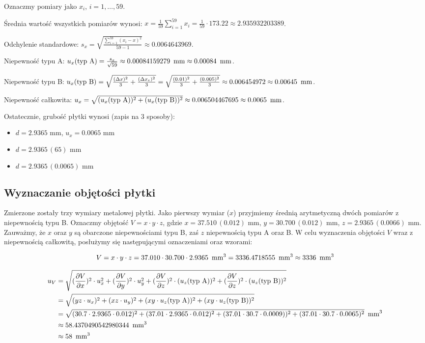 \documentclass[a4paper]{article}
\begin{document}
Oznaczmy pomiary jako $x_i$, $i = 1, \dots, 59$.

Średnia wartość wszystkich pomiarów wynosi: $x = \frac{1}{59} \sum_{i = 1}^{59} x_i = \frac{1}{59} \cdot 173.22 \approx 2.935932203389$.

Odchylenie standardowe: $s_x = \sqrt{\frac{\sum_{i=1}^{59} (x_i - x)^2}{59 - 1}} \approx 0.0064643969$.

Niepewność typu A: $u_x (\text{typ A}) = \frac{s_x}{\sqrt{59}} \approx 0.00084159279 \enskip \text{mm} \approx 0.00084 \enskip \text{mm}$.

Niepewność typu B: $u_x (\text{typ B}) = \sqrt{\frac{(\Delta x)^2}{3} + \frac{(\Delta x_e)^2}{3}} = \sqrt{\frac{(0.01)^2}{3} + \frac{(0.005)^2}{3}} \approx 0.006454972 \approx 0.00645 \enskip \text{mm}$.

Niepewność całkowita: $u_x = \sqrt{(u_x (\text{typ A}))^2 + (u_x (\text{typ B}))^2} \approx 0.006504467695 \approx 0.0065 \enskip \text{mm}$.

Ostatecznie, grubość płytki wynosi (zapis na 3 sposoby):
\begin{itemize}
\item $d = 2.9365$ mm, $u_x = 0.0065$ mm
\item $d = 2.9365 \, (65)$ mm
\item $d = 2.9365 \, (0.0065)$ mm
\end{itemize}

\subsection{Wyznaczanie objętości płytki}

Zmierzone zostały trzy wymiary metalowej płytki.
Jako pierwszy wymiar ($x$) przyjmiemy średnią arytmetyczną dwóch pomiarów z niepewnością typu B.
Oznaczmy objętość $V = x \cdot y \cdot z$, gdzie $x = 37.510 \, (0.012)$ mm, $y = 30.700 \, (0.012)$ mm, $z = 2.9365 \, (0.0066)$ mm.
Zauważmy, że $x$ oraz $y$ są obarczone niepewnościami typu B, zaś $z$ niepewnością typu A oraz B.
W celu wyznaczenia objętości $V$ wraz z niepewnością całkowitą, posłużymy się następującymi oznaczeniami oraz wzorami:

$$V = x \cdot y \cdot z = 37.010 \cdot 30.700 \cdot 2.9365 \enskip \text{mm}^3 = 3336.4718555 \enskip \text{mm}^3 \approx 3336 \enskip \text{mm}^3$$

\begin{align*}
u_V &= \sqrt{(\frac{\partial V}{\partial x})^2 \cdot u_x^2 + (\frac{\partial V}{\partial y})^2 \cdot u_y^2 + (\frac{\partial V}{\partial z})^2 \cdot (u_z \text{(typ A)})^2 + (\frac{\partial V}{\partial z})^2 \cdot (u_z \text{(typ B)})^2} \\
	&= \sqrt{(yz \cdot u_x)^2 + (xz \cdot u_y)^2 + (xy \cdot u_z \text{(typ A)})^2 + (xy \cdot u_z \text{(typ B)})^2} \\
	&= \sqrt{(30.7 \cdot 2.9365 \cdot 0.012)^2 + (37.01 \cdot 2.9365 \cdot 0.012)^2 + (37.01 \cdot 30.7 \cdot 0.0009))^2 + (37.01 \cdot 30.7 \cdot 0.0065)^2} \enskip \text{mm}^3\\
	&\approx 58.4370490542980344 \enskip \text{mm}^3 \\
	&\approx 58 \enskip \text{mm}^3
\end{align*}
\end{document}
